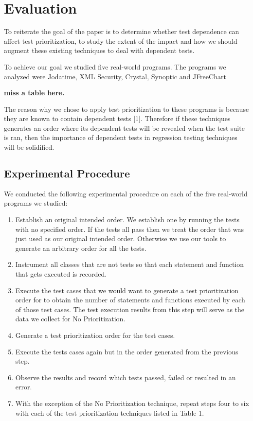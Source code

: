 \section{Evaluation}
\label{sec:evaluation}

To reiterate the goal of the paper is to determine whether test dependence can affect test prioritization, to study the extent of the impact and how we should augment these existing techniques to deal with dependent tests.

To achieve our goal we studied five real-world programs. The programs we analyzed were Jodatime, XML Security, Crystal, Synoptic and JFreeChart 

\textbf{miss a table here.}

The reason why we chose to apply test prioritization to these programs is because they are known to contain dependent tests [1]. Therefore if these techniques generates an order where its dependent tests will be revealed when the test suite is ran, then the importance of dependent tests in regression testing techniques will be solidified.

\subsection{Experimental Procedure}

We conducted the following experimental procedure on each of the five real-world programs we studied:

\begin{enumerate}
\item Establish an original intended order. We establish one by running the tests with no specified order. If the tests all pass then we treat the order that was just used as our original intended order. Otherwise we use our tools to generate an arbitrary order for all the tests. 
\item Instrument all classes that are not tests so that each statement and function that gets executed is recorded.
\item Execute the test cases that we would want to generate a test prioritization order for to obtain the number of statements and functions executed by each of those test cases. The test execution results from this step will serve as the data we collect for No Prioritization. 
\item Generate a test prioritization order for the test cases. 
\item Execute the tests cases again but in the order generated from the previous step.
\item Observe the results and record which tests passed, failed or resulted in an error.
\item With the exception of the No Prioritization technique, repeat steps four to six with each of the test prioritization techniques listed in Table 1.
\end{enumerate}


